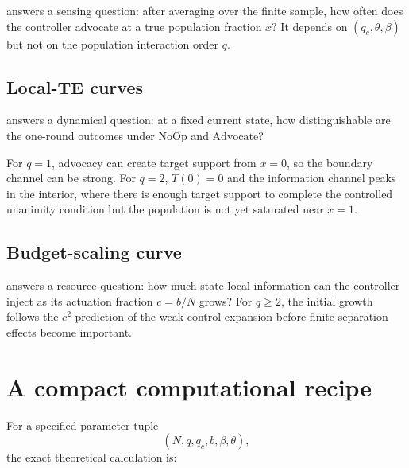 \documentclass[11pt,a4paper]{article}
\newcommand{\Adv}{\ensuremath{\mathrm{Advocate}}}
\newcommand{\NoOp}{\ensuremath{\mathrm{NoOp}}}
\newcommand{\1}{\mathbbm{1}}
\begin{document}
 answers a sensing question: after averaging over the finite sample, how often does the controller advocate at a true population fraction $x$? It depends on $(q_c,\theta,\beta)$ but not on the population interaction order $q$.

\subsection{Local-TE curves}

 answers a dynamical question: at a fixed current state, how distinguishable are the one-round outcomes under \NoOp{} and \Adv{}?

For $q=1$, advocacy can create target support from $x=0$, so the boundary channel can be strong. For $q=2$, $T(0)=0$ and the information channel peaks in the interior, where there is enough target support to complete the controlled unanimity condition but the population is not yet saturated near $x=1$.

\subsection{Budget-scaling curve}

 answers a resource question: how much state-local information can the controller inject as its actuation fraction $c=b/N$ grows? For $q\ge2$, the initial growth follows the $c^2$ prediction of the weak-control expansion before finite-separation effects become important.

\section{A compact computational recipe}

For a specified parameter tuple
\[
(N,q,q_c,b,\beta,\theta),
\]
the exact theoretical calculation is:
\end{document}
